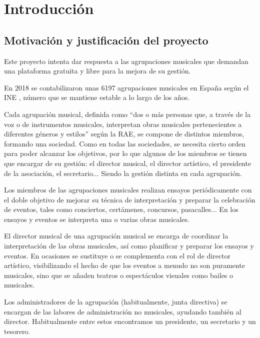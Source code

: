 \chapter{Introducción}

\section{Motivación y justificación del proyecto}


Este proyecto intenta dar respuesta a las agrupaciones musicales que demandan una plataforma gratuita y libre para la mejora de su gestión.

En 2018 se contabilizaron unas 6197 agrupaciones musicales en España según el INE \cite{ineNumeroAgrupaciones}, número que se mantiene estable a lo largo de los años.

Cada agrupación musical, definida como ``dos o más personas que, a través de la voz o de instrumentos musicales, interpretan obras musicales pertenecientes a diferentes géneros y estilos'' según la RAE, se compone de distintos miembros, formando una sociedad. Como en todas las sociedades, se necesita cierto orden para poder alcanzar los objetivos, por lo que algunos de los miembros se tienen que encargar de su gestión: el director musical, el director artístico, el presidente de la asociación, el secretario... Siendo la gestión distinta en cada agrupación.

Los miembros de las agrupaciones musicales realizan ensayos periódicamente con el doble objetivo de mejorar su técnica de interpretación y preparar la celebración de eventos, tales como conciertos, certámenes, concursos, pasacalles... En los ensayos y eventos se interpreta una o varias obras musicales.

El director musical de una agrupación musical se encarga de coordinar la interpretación de las obras musicales, así como planificar y preparar los ensayos y eventos. En ocasiones se sustituye o se complementa con el rol de director artístico, visibilizando el hecho de que los eventos a menudo no son puramente musicales, sino que se añaden teatros o espectáculos visuales como bailes o musicales.

Los administradores de la agrupación (habitualmente, junta directiva) se encargan de las labores de administración no musicales, ayudando también al director. Habitualmente entre estos encontramos un presidente, un secretario y un tesorero.

